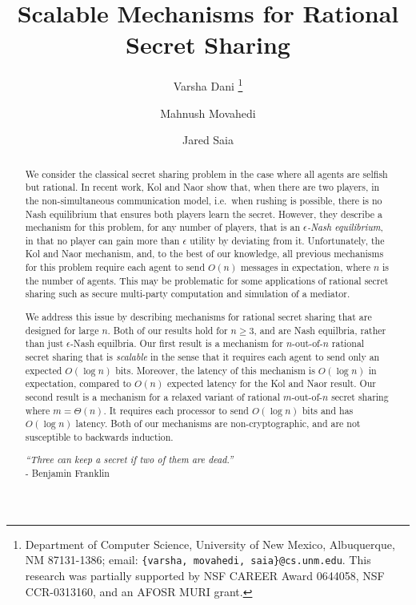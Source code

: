 \documentclass[12pt]{article}
\theoremstyle{definition}
\begin{document}
\title{Scalable Mechanisms for Rational Secret Sharing}

\author{Varsha Dani \thanks{Department of Computer Science,  
University of New Mexico,  Albuquerque,  NM 87131-1386;
email: {\tt \{varsha, movahedi, saia\}@cs.unm.edu}. 
This research was partially supported by NSF CAREER Award 0644058,
NSF CCR-0313160, and an AFOSR MURI grant.} 
\and Mahnush Movahedi \footnotemark[1] \and Jared Saia \footnotemark[1]}

\date{}

\maketitle
\begin{abstract}

We consider the classical secret sharing problem in the case where all
agents are selfish but rational. In recent work, Kol and Naor show
that, when there are two players, in the non-simultaneous communication model, i.e.\ when rushing is
possible, there is no Nash equilibrium that ensures both players learn
the secret.  However, they describe a mechanism for this problem, for any number of players, that
is an \emph{$\epsilon$-Nash equilibrium}, in that no player can gain more than $\epsilon$
utility by deviating from it. Unfortunately, the Kol and Naor
mechanism, and, to the best of our knowledge, all previous mechanisms
for this problem require each agent to send $O(n)$ messages in
expectation, where $n$ is the number of agents.  This may be
problematic for some applications of rational secret sharing such as
secure multi-party computation and simulation of a mediator.

We address this issue by describing mechanisms for rational
 secret sharing that are designed for large $n$.  Both of our results hold for $n \geq 3$, and are Nash equilbria, rather than just $\epsilon$-Nash equilbria.
 Our first result is a mechanism for $n$-out-of-$n$ rational secret sharing that is \emph{scalable} in the sense that it requires each agent to
send only an expected $O(\log n)$ bits.  Moreover, the latency of this
mechanism is $O(\log n)$ in expectation, compared to $O(n)$ expected
latency for the Kol and Naor result.  Our second result is a mechanism for a
relaxed variant of rational $m$-out-of-$n$ secret sharing where $m =
\Theta(n)$.  It requires each processor to send $O(\log n)$ bits and
has $O(\log n)$ latency.  Both of our mechanisms are non-cryptographic, and
are not susceptible to backwards induction.
\begin{flushright}
\emph{``Three can keep a secret if two of them are dead.''}\\ -
Benjamin Franklin
\end{flushright}
\end{abstract}
\end{document}
